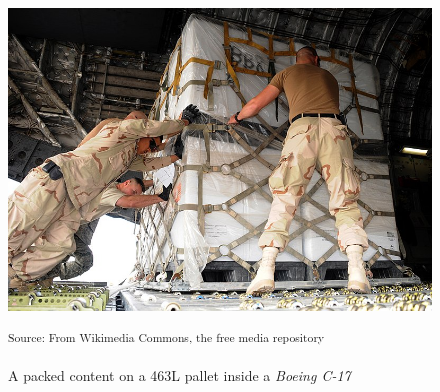 \documentclass[preprint]{elsarticle}
\begin{document}
\begin{figure}[H]
	\centering
	\includegraphics[scale=0.4]{Images/consolidated.jpg}
	\caption{A packed content on a 463L pallet inside a {\it Boeing C-17}}
	\small\textsuperscript{Source: From Wikimedia Commons, the free media repository}
	\label{fig:larger2}
\end{figure}
\end{document}
